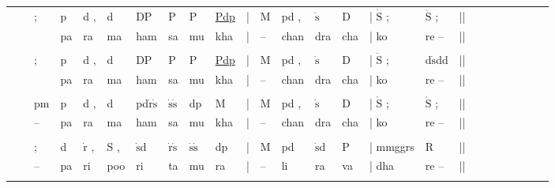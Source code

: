 \documentclass[12pt]{article}
\newcommand*\od[1]{\mathrm{\dot{#1}}}
\begin{document}
\begin{tabu}{l l l l l l l l l l l l l l l l l l l l l l l l l }

&&; &p&d ,&d&DP&P&P&\underline{Pdp}&|&M& pd ,&$\od{s}$&D&| $\od{S}$ ;&$\od{S}$ ;&||\\
\rowfont{\scriptsize}&& &pa&ra&ma&ham &sa&mu&kha&|&--&chan&dra& cha&| ko&re --&||\\
\\
&&; &p&d ,&d&DP&P&P&\underline{Pdp}&|&M& pd ,&$\od{s}$&D&| $\od{S}$ ;&d$\od{s}$dd&||\\
\rowfont{\scriptsize}&& &pa&ra&ma&ham &sa&mu&kha&|&--&chan&dra& cha&| ko&re --&||\\
\\
&&pm &p&d ,&d&pd$\od{r}$$\od{s}$&$\od{s}$$\od{s}$&dp&M&|&M& pd ,&$\od{s}$&D&| $\od{S}$ ;&$\od{S}$ ;&||\\
\rowfont{\scriptsize}&&--&pa&ra&ma&ham &sa&mu&kha&|&--&chan&dra& cha&| ko&re --&||\\
\\
&&; &d&$\od{r}$ ,&S ,&$\od{s}$d&$\od{r}$$\od{s}$&$\od{s}$$\od{s}$&dp&|&M& pd &$\od{s}$d&P&| mmggrs&R&||\\
\rowfont{\scriptsize}&&--&pa&ri&poo&ri &ta&mu&ra&|&--&li&ra& va&| dha&re --&||\\
\\

\end{tabu}
\end{document}
